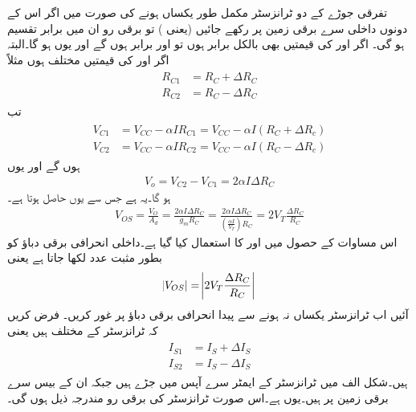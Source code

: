 تفرقی جوڑے کے دو ٹرانزسٹر مکمل طور یکساں ہونے کی صورت میں اگر اس کے دونوں داخلی سرے برقی زمین پر رکھے جائیں (یعنی  ) تو برقی رو  ان میں برابر تقسیم ہو گی۔ اگر  اور  کی قیمتیں بھی بالکل برابر ہوں تو  اور  برابر ہوں گے اور یوں  ہو گا۔البتہ اگر  اور  کی قیمتیں مختلف ہوں مثلاً
\begin{gather}
\begin{aligned}
R_{C1}&=R_C + \Delta R_C\\
R_{C2}&=R_C-\Delta R_C
\end{aligned}
\end{gather}
تب
\begin{gather}
\begin{aligned}
V_{C1}&=V_{CC}-\alpha I R_{C1}=V_{CC}-\alpha I \left (R_C + \Delta R_c \right )\\
V_{C2}&=V_{CC}-\alpha I R_{C2}=V_{CC}-\alpha I \left (R_C - \Delta R_c \right )
\end{aligned}
\end{gather}
ہوں گے اور یوں
\begin{align}
V_o=V_{C2}-V_{C1}=2 \alpha I \Delta R_C
\end{align}
ہو گا۔یہ  ہے جس سے  یوں حاصل ہوتا ہے۔
\begin{align}
V_{OS}=\frac{V_O}{ A_d}=\frac{2 \alpha I \Delta R_C}{g_m R_C} = \frac{2 \alpha I \Delta R_C}{\left( \frac{\alpha I}{V_T} \right ) R_C} =2 V_T \frac{\Delta R_C}{R_C}
\end{align}
اس مساوات کے حصول میں  اور  کا استعمال کیا گیا ہے۔داخلی انحرافی برقی دباؤ کو بطور مثبت عدد لکھا جاتا ہے یعنی
\begin{align}
\abs{V_{OS}}=\abs{2 V_T \frac{\Delta R_C}{R_C}}
\end{align}
آئیں اب ٹرانزسٹر یکساں نہ ہونے سے پیدا انحرافی برقی دباؤ پر غور کریں۔ فرض کریں کہ ٹرانزسٹر کے  مختلف ہیں یعنی
\begin{gather}
\begin{aligned}
I_{S1}&=I_S+\Delta I_S \\
I_{S2}&=I_S - \Delta I_S
\end{aligned}
\end{gather}
ہیں۔شکل  الف میں ٹرانزسٹر کے ایمٹر سرے آپس میں جڑے ہیں جبکہ ان کے بیس  سرے برقی زمین پر ہیں۔یوں  ہے۔اس صورت ٹرانزسٹر کی برقی رو مندرجہ ذیل ہوں گی۔
